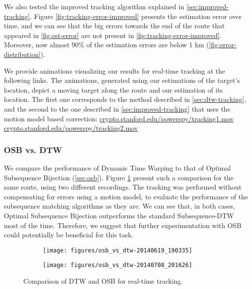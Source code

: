 We also tested the improved tracking algorithm explained in \cref{sec:improved-tracking}.
Figure \ref{fig:tracking-error-improved} presents the estimation error over time,
and we can see that the big errors towards the end of the route that appeared in
\ref{fig:est-error} are not present in \cref{fig:tracking-error-improved}. Moreover, now almost 90\% of the estimation
errors are below 1 km (\cref{fig:error-distribution}).

We provide animations visualizing our results for real-time tracking at the following links.
The animations, generated using our estimations of the target's location, depict
a moving target along the route and our estimation of its location.
The first one corresponds to the method described in \ref{sec:dtw-tracking},
and the second to the one described in \ref{sec:improved-tracking} that uses the
motion model based correction: \newline
\textcolor{blue}{\url{crypto.stanford.edu/powerspy/tracking1.mov}} \newline
\textcolor{blue}{\url{crypto.stanford.edu/powerspy/tracking2.mov}}

\subsubsection{OSB vs. DTW}
We compare the performance of Dynamic Time Warping to that of Optimal Subsequence Bijection (\cref{sec:osb}).
Figure \ref{fig:dtw_vs_osb} present such a comparison for the same route, using two different recordings.
The tracking was performed without compensating for errors using a motion model, to evaluate the performance
of the subsequence matching algorithms as they are.
We can see that, in both cases, Optimal Subsequence Bijection outperforms the standard Subsequence-DTW most of the time.
Therefore, we suggest that further experimentation with OSB could potentially be beneficial for this task.

\begin{figure}
   \centering
   \begin{subfigure}{0.4\textwidth}
        \texttt{[image: figures/osb\_vs\_dtw-20140619\_190335]}
   \end{subfigure}
   \begin{subfigure}{0.4\textwidth}
        \texttt{[image: figures/osb\_vs\_dtw-20140708\_201626]}
   \end{subfigure}
   \caption{Comparison of DTW and OSB for real-time tracking.}
   \label{fig:dtw_vs_osb}
\end{figure}


